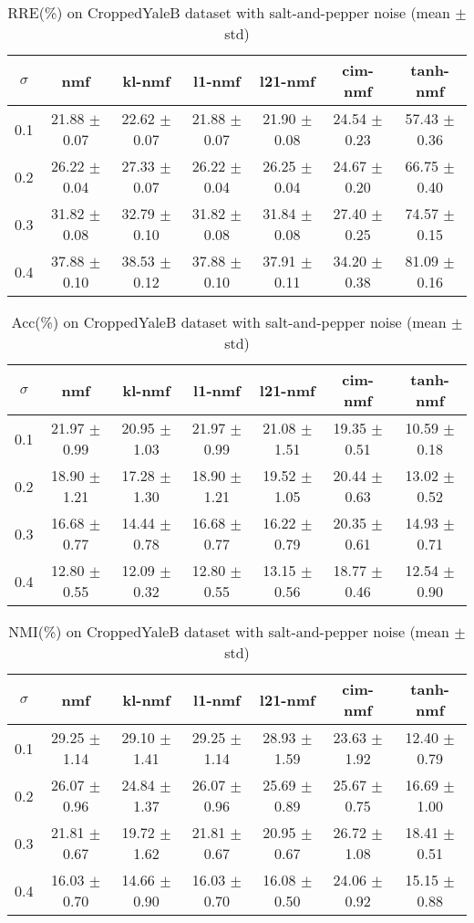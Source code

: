 \documentclass{article} %
\begin{document}
\begin{table}
\begin{tabular}{c|cccccc}$\sigma$ & nmf & kl-nmf & l1-nmf & l21-nmf & cim-nmf & tanh-nmf \\\hline
0.1 & 21.88 $\pm$ 0.07 & 22.62 $\pm$ 0.07 & 21.88 $\pm$ 0.07 & 21.90 $\pm$ 0.08 & 24.54 $\pm$ 0.23 & 57.43 $\pm$ 0.36 \\
0.2 & 26.22 $\pm$ 0.04 & 27.33 $\pm$ 0.07 & 26.22 $\pm$ 0.04 & 26.25 $\pm$ 0.04 & 24.67 $\pm$ 0.20 & 66.75 $\pm$ 0.40 \\
0.3 & 31.82 $\pm$ 0.08 & 32.79 $\pm$ 0.10 & 31.82 $\pm$ 0.08 & 31.84 $\pm$ 0.08 & 27.40 $\pm$ 0.25 & 74.57 $\pm$ 0.15 \\
0.4 & 37.88 $\pm$ 0.10 & 38.53 $\pm$ 0.12 & 37.88 $\pm$ 0.10 & 37.91 $\pm$ 0.11 & 34.20 $\pm$ 0.38 & 81.09 $\pm$ 0.16 \\
\end{tabular}\caption{
  RRE(\%) on CroppedYaleB dataset with salt-and-pepper noise (mean $\pm$ std)
  \label{tab:RRE-CroppedYaleB-salt-and-pepper}
}\end{table}
\begin{table}
\begin{tabular}{c|cccccc}$\sigma$ & nmf & kl-nmf & l1-nmf & l21-nmf & cim-nmf & tanh-nmf \\\hline
0.1 & 21.97 $\pm$ 0.99 & 20.95 $\pm$ 1.03 & 21.97 $\pm$ 0.99 & 21.08 $\pm$ 1.51 & 19.35 $\pm$ 0.51 & 10.59 $\pm$ 0.18 \\
0.2 & 18.90 $\pm$ 1.21 & 17.28 $\pm$ 1.30 & 18.90 $\pm$ 1.21 & 19.52 $\pm$ 1.05 & 20.44 $\pm$ 0.63 & 13.02 $\pm$ 0.52 \\
0.3 & 16.68 $\pm$ 0.77 & 14.44 $\pm$ 0.78 & 16.68 $\pm$ 0.77 & 16.22 $\pm$ 0.79 & 20.35 $\pm$ 0.61 & 14.93 $\pm$ 0.71 \\
0.4 & 12.80 $\pm$ 0.55 & 12.09 $\pm$ 0.32 & 12.80 $\pm$ 0.55 & 13.15 $\pm$ 0.56 & 18.77 $\pm$ 0.46 & 12.54 $\pm$ 0.90 \\
\end{tabular}\caption{
  Acc(\%) on CroppedYaleB dataset with salt-and-pepper noise (mean $\pm$ std)
  \label{tab:Acc-CroppedYaleB-salt-and-pepper}
}\end{table}
\begin{table}
\begin{tabular}{c|cccccc}$\sigma$ & nmf & kl-nmf & l1-nmf & l21-nmf & cim-nmf & tanh-nmf \\\hline
0.1 & 29.25 $\pm$ 1.14 & 29.10 $\pm$ 1.41 & 29.25 $\pm$ 1.14 & 28.93 $\pm$ 1.59 & 23.63 $\pm$ 1.92 & 12.40 $\pm$ 0.79 \\
0.2 & 26.07 $\pm$ 0.96 & 24.84 $\pm$ 1.37 & 26.07 $\pm$ 0.96 & 25.69 $\pm$ 0.89 & 25.67 $\pm$ 0.75 & 16.69 $\pm$ 1.00 \\
0.3 & 21.81 $\pm$ 0.67 & 19.72 $\pm$ 1.62 & 21.81 $\pm$ 0.67 & 20.95 $\pm$ 0.67 & 26.72 $\pm$ 1.08 & 18.41 $\pm$ 0.51 \\
0.4 & 16.03 $\pm$ 0.70 & 14.66 $\pm$ 0.90 & 16.03 $\pm$ 0.70 & 16.08 $\pm$ 0.50 & 24.06 $\pm$ 0.92 & 15.15 $\pm$ 0.88 \\
\end{tabular}\caption{
  NMI(\%) on CroppedYaleB dataset with salt-and-pepper noise (mean $\pm$ std)
  \label{tab:NMI-CroppedYaleB-salt-and-pepper}
}\end{table}
\end{document}

